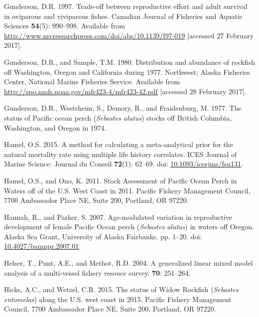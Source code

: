 \documentclass[12pt,]{article}
\begin{document}
\hypertarget{ref-gunderson_trade-off_1997}{}
Gunderson, D.R. 1997. Trade-off between reproductive effort and adult
survival in oviparous and viviparous fishes. Canadian Journal of
Fisheries and Aquatic Sciences \textbf{54}(5): 990--998. Available from
\url{http://www.nrcresearchpress.com/doi/abs/10.1139/f97-019}
{[}accessed 27 February 2017{]}.

\hypertarget{ref-gunderson_distribution_1980}{}
Gunderson, D.R., and Sample, T.M. 1980. Distribution and abundance of
rockfish off Washington, Oregon and California during 1977. Northwest;
Alaska Fisheries Center, National Marine Fisheries Service. Available
from \url{http://spo.nmfs.noaa.gov/mfr423-4/mfr423-42.pdf} {[}accessed
28 February 2017{]}.

\hypertarget{ref-gunderson_status_1977}{}
Gunderson, D.R., Westrheim, S., Demory, R., and Fraidenburg, M. 1977.
The status of Pacific ocean perch (\emph{Sebastes alutus}) stocks off
British Columbia, Washington, and Oregon in 1974.

\hypertarget{ref-hamel_method_2015}{}
Hamel, O.S. 2015. A method for calculating a meta-analytical prior for
the natural mortality rate using multiple life history correlates. ICES
Journal of Marine Science: Journal du Conseil \textbf{72}(1): 62--69.
doi:
\href{https://doi.org/10.1093/icesjms/fsu131}{10.1093/icesjms/fsu131}.

\hypertarget{ref-hamel_stock_2011}{}
Hamel, O.S., and Ono, K. 2011. Stock Assessment of Pacific Ocean Perch
in Waters off of the U.S. West Coast in 2011. Pacific Fishery Management
Council, 7700 Ambassador Place NE, Suite 200, Portland, OR 97220.

\hypertarget{ref-hannah_age-modulated_2007}{}
Hannah, R., and Parker, S. 2007. Age-modulated variation in reproductive
development of female Pacific Ocean perch (\emph{Sebastes alutus}) in
waters off Oregon. Alaska Sea Grant, University of Alaska Fairbanks. pp.
1--20. doi:
\href{https://doi.org/10.4027/bamnpr.2007.01}{10.4027/bamnpr.2007.01}.

\hypertarget{ref-helser_generalized_2004}{}
Helser, T., Punt, A.E., and Methot, R.D. 2004. A generalized linear
mixed model analysis of a multi-vessel fishery resouce survey.
\textbf{70}: 251--264.

\hypertarget{ref-hicks_status_2015}{}
Hicks, A.C., and Wetzel, C.R. 2015. The status of Widow Rockfish
(\emph{Sebastes entomelas}) along the U.S. west coast in 2015. Pacific
Fishery Management Council, 7700 Ambassador Place NE, Suite 200,
Portland, OR 97220.
\end{document}
